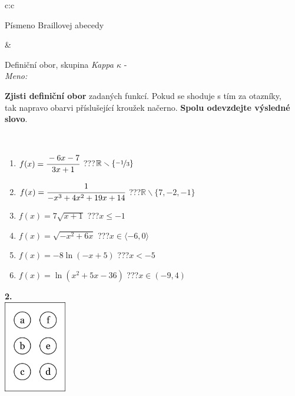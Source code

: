 \documentclass[10pt]{report}
\begin{document}
\begin{tabular}{c:c}
\begin{minipage}[c][104.5mm][t]{0.5\linewidth}
\begin{center}
\begin{minipage}{0.20\linewidth}
\begin{center}
{\small Písmeno Braillovej abecedy}
\end{center}
\end{minipage}
\end{center}
\end{minipage}
&
\begin{minipage}[c][104.5mm][t]{0.5\linewidth}
\begin{center}
\vspace{7mm}
{\huge Definiční obor, skupina \textit{Kappa $\kappa$} -}\\[5mm]
\textit{Meno:}\phantom{xxxxxxxxxxxxxxxxxxxxxxxxxxxxxxxxxxxxxxxxxxxxxxxxxxxxxxxxxxxxxxxxx}\\[5mm]
\begin{minipage}{0.95\linewidth}
\textbf{Zjisti definiční obor} zadaných funkcí. Pokud se shoduje s tím za otazníky,\\tak napravo obarvi příslušející kroužek načerno. \textbf{Spolu odevzdejte výsledné slovo}.
\end{minipage}
\\[1mm]
\begin{minipage}{0.79\linewidth}
\begin{center}
\begin{varwidth}{\linewidth}
\begin{enumerate}
\normalsizerrr
\item $f(x)=\cfrac{-6x-7}{3x+1}$\quad \dotfill\; ???\;\dotfill \quad $\mathbb{R}\smallsetminus\{\nicefrac{-1}{3}\}$
\item $f(x)=\cfrac{1}{-x^3+4x^2+19x+14}$\quad \dotfill\; ???\;\dotfill \quad $\mathbb{R}\smallsetminus\{7,-2,-1\}$
\item $f(x)=7\sqrt{x+1}$\quad \dotfill\; ???\;\dotfill \quad $x\leq-1$
\item $f(x)=\sqrt{-x^2+6x}$\quad \dotfill\; ???\;\dotfill \quad $x\in\langle-6 , 0\rangle$
\item $f(x)=-8\ln{(-x+5)}$\quad \dotfill\; ???\;\dotfill \quad $x<-5$
\item $f(x)=\ln{(x^2+5x-36)}$\quad \dotfill\; ???\;\dotfill \quad $x\in(-9 , 4)$
\end{enumerate}
\end{varwidth}
\end{center}
\end{minipage}
\begin{minipage}{0.20\linewidth}
\begin{center}
{\Huge\bfseries 2.} \\[2mm]
\includegraphics[height=40mm]{../images/braille.png}

\end{center}
\end{minipage}
\end{center}
\end{minipage}
\end{tabular}
\end{document}
